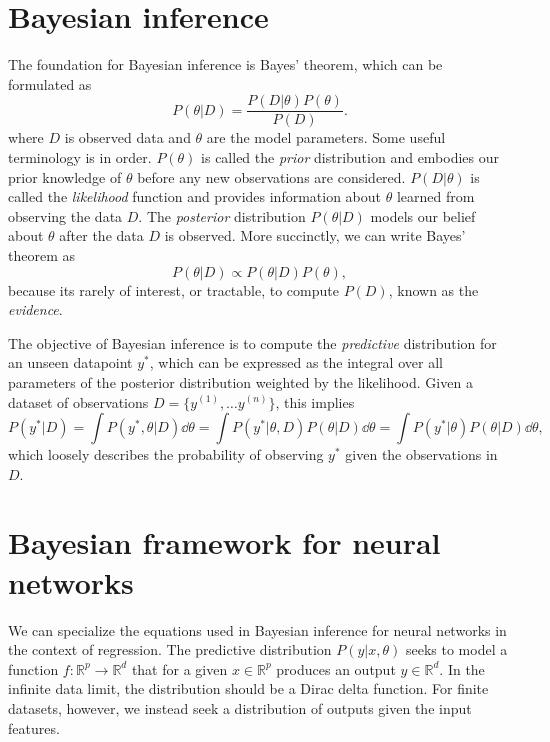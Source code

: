 
\section{Bayesian inference}
The foundation for Bayesian inference is Bayes' theorem, which can be formulated as
\begin{equation}
	P(\theta | D) = \frac{P(D|\theta)P(\theta)}{P(D)}.
\end{equation}
where $D$ is observed data and $\theta$ are the model parameters.
Some useful terminology is in order. $P(\theta)$ is called the \textit{prior} distribution and embodies our prior knowledge of $\theta$ before any new observations are considered. $P(D|\theta)$ is called the \textit{likelihood} function and provides information about $\theta$ learned from observing the data $D$. The \textit{posterior} distribution $P(\theta|D)$ models our belief about $\theta$ after the data $D$ is observed. More succinctly, we can write Bayes' theorem as
\begin{equation}
  P(\theta|D) \propto P(\theta|D)P(\theta),
\end{equation}
because its rarely of interest, or tractable, to compute $P(D)$, known as the \textit{evidence}.

The objective of Bayesian inference is to compute the \textit{predictive} distribution for an unseen datapoint $y^*$, which can be expressed as
the integral over all parameters of the posterior distribution weighted by the likelihood. Given a dataset of observations $D = \{y^{(1)}, \ldots y^{(n)}\}$, this implies
\begin{equation}
  P(y^*|D) = \int P(y^*, \theta|D)\dd\theta =\int P(y^*|\theta, D)P(\theta|D)\dd \theta = \int P(y^*|\theta)P(\theta|D)\dd\theta,
\end{equation}
which loosely describes the probability of observing $y^*$ given the observations in $D$.


\section{Bayesian framework for neural networks}

We can specialize the equations used in Bayesian inference for neural networks in the context of regression.
The predictive distribution $P(y|x, \theta)$ seeks to model a function $f : \mathbb{R}^p \to \mathbb{R}^d$ that for a given $x \in \mathbb{R}^p$ produces an output $y \in \mathbb{R}^d$. In the infinite data limit, the distribution should be a Dirac delta function. For finite datasets, however, we instead seek a distribution of outputs given the input features.

